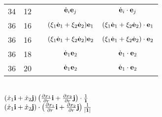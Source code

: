 \documentclass[a4paper,11pt]{article}
\numberwithin{equation}{section}
\begin{document}
\begin{center}
\begin{tabular}{|c|c|c|c|c|}
    34  & 12 & & $\dot{ \mathbf{e} }_{ i } \mathbf{e}_{ j }$
           & $\dot{ \mathbf{e} }_{ i } \cdot \mathbf{e}_{ j }$ \\
    36  & 16 & & $( \xi_{ 1 } \dot{ \mathbf{e} }_{ 1 }
                 + \xi_{ 2 } \dot{ \mathbf{e} }_{ 2 }  ) \mathbf{e}_{ 1 }$
           & $( \xi_{ 1 } \dot{ \mathbf{e} }_{ 1 }
             + \xi_{ 2 } \dot{ \mathbf{e} }_{ 2 }  ) \cdot \mathbf{e}_{ 1 }$ \\
    36  & 16 & & $( \xi_{ 1 } \dot{ \mathbf{e} }_{ 1 }
                 + \xi_{ 2 } \dot{ \mathbf{e} }_{ 2 }  ) \mathbf{e}_{ 2 }$
           & $( \xi_{ 1 } \dot{ \mathbf{e} }_{ 1 }
             + \xi_{ 2 } \dot{ \mathbf{e} }_{ 2 }  ) \cdot \mathbf{e}_{ 2 }$ \\
    36  & 18 & & $\dot{ \mathbf{e} }_{ 1 } \mathbf{e}_{ 2 }$
           & $\dot{ \mathbf{e} }_{ 1 } \cdot \mathbf{e}_{ 2 }$ \\
    36  & 20 & & $\dot{ \mathbf{e} }_{ 1 } \mathbf{e}_{ 2 }$
           & $\dot{ \mathbf{e} }_{ 1 } \cdot \mathbf{e}_{ 2 }$ \\
    \hline
  \end{tabular}

\end{center}

\vspace{\spaceTwo}


\noindent
{} \\[0.3em]
\Jest
$( \dot{ x }_{ 1 } \mathbf{i} + \dot{ x }_{ 2 } \mathbf{j} )
\left( \frac{ \partial x_{ 1 } }{ \partial r } \mathbf{i}
  + \frac{ \partial x_{ 2 } }{ \partial r } \mathbf{j} \right)
\cdot \frac{ 1 }{ \mathbf{1} }$ \\[0.5em]
\Powin
$( \dot{ x }_{ 1 } \mathbf{i} + \dot{ x }_{ 2 } \mathbf{j} )
\cdot \left( \frac{ \partial x_{ 1 } }{ \partial r } \mathbf{i}
  + \frac{ \partial x_{ 2 } }{ \partial r } \mathbf{j} \right)
\frac{ 1 }{ | \mathbf{1} | }$ \\













\newpage

\end{document}
